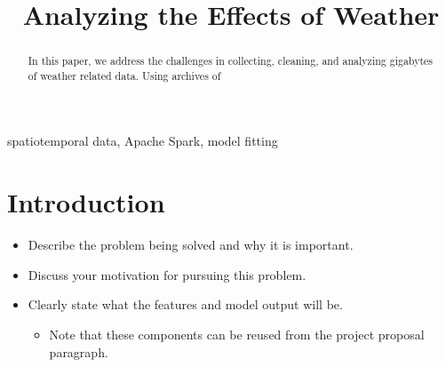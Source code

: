\documentclass[conference]{IEEEtran}
\begin{document}
\title{Analyzing the Effects of Weather}
\author{
\and
{}
\and
{}
}

\maketitle

\begin{abstract}
In this paper, we address the challenges in collecting, cleaning, and analyzing gigabytes of weather related data. Using archives of
\end{abstract}

\begin{IEEEkeywords}
spatiotemporal data, Apache Spark, model fitting
\end{IEEEkeywords}

\section{Introduction}

\begin{itemize}
  \item Describe the problem being solved and why it is important.
  \item Discuss your motivation for pursuing this problem.
  \item Clearly state what the features and model output will be.
  \begin{itemize}
    \item Note that these components can be reused from the project proposal paragraph.
  \end{itemize}
\end{itemize}
\end{document}
